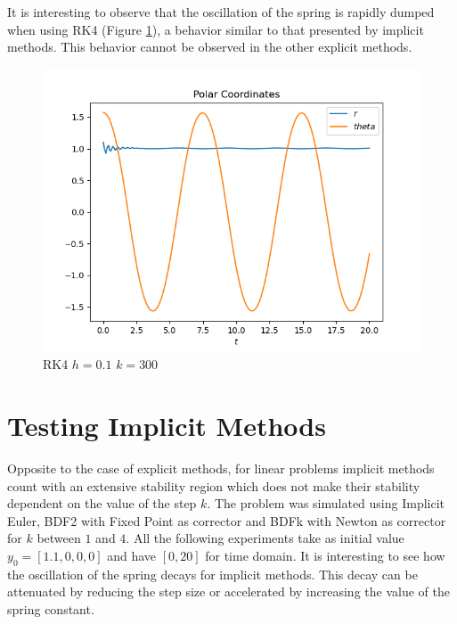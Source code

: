 \documentclass{report}
\newcounter{constant}
\begin{document}
It is interesting to observe that the oscillation of the spring is rapidly dumped when using RK4 (Figure \ref{rk4_h=0.1_k=300_c}), a behavior similar to that presented by implicit methods.
This behavior cannot be observed in the other explicit methods.

\begin{figure}[h]
\centering
\begin{minipage}[b]{0.45\textwidth}
\centering
\includegraphics[width=\textwidth]{../Plots/RK4/rk4_h=0.1_k=300_c}
\caption{RK4 $h=0.1$ $k=300$}
\label{rk4_h=0.1_k=300_c}
\end{minipage}
\end{figure}

\section*{Testing Implicit Methods}

Opposite to the case of explicit methods, for linear problems implicit methods count with an extensive stability region which does not make their stability dependent on the value of the step $k$.
The problem was simulated using Implicit Euler, BDF2 with Fixed Point as corrector and BDFk with Newton as corrector for $k$ between $1$ and $4$. All the following experiments take as initial value $y_0 = [1.1, 0, 0, 0]$ and have $[0, 20]$ for time domain.
It is interesting to see how the oscillation of the spring decays for implicit methods. This decay can be attenuated by reducing the step size or accelerated by increasing the value of the spring constant.
\end{document}

